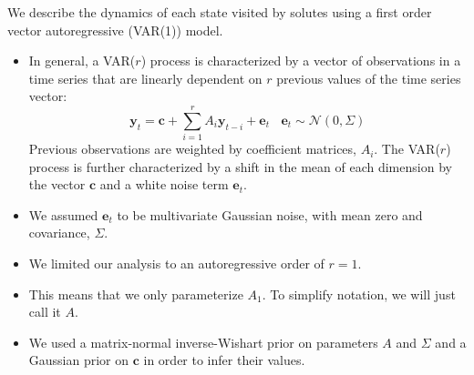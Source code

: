 \documentclass{article}
\begin{document}
  We describe the dynamics of each state visited by solutes using a first order vector 
  autoregressive (VAR(1)) model. 
  \begin{itemize}
  	\item In general, a VAR($r$) process is characterized by a vector of observations in a time series 
  	that are linearly dependent on $r$ previous values of the time series vector:
  	\begin{equation}
  	\mathbf{y}_t = \mathbf{c} + \sum_{i=1}^r A_i\mathbf{y}_{t-i} + \mathbf{e}_t~~~~\mathbf{e}_t \sim \mathcal{N}(0, \Sigma)
  	\label{eqn:var}
  	\end{equation}
  	Previous observations are weighted by coefficient matrices, $A_i$. The VAR($r$) 
  	process is further characterized by a shift in the mean of each dimension by the
  	vector $\mathbf{c}$ and a white noise term $\mathbf{e}_t$.~\cite{hamilton_time_1994}
  	\item We assumed $\mathbf{e}_t$ to be multivariate Gaussian noise, with mean zero and
  	covariance, $\Sigma$.
  	\item We limited our analysis to an autoregressive order of $r=1$.
  	\item This means that we only parameterize $A_1$. To simplify notation, we will just
  	call it $A$.
  	\item We used a matrix-normal inverse-Wishart prior on parameters $A$ and $\Sigma$ 
  	and a Gaussian prior on $\mathbf{c}$ in order to infer their values.~\cite{fox_nonparametric_2009}
  \end{itemize}   
  
  
\end{document}
